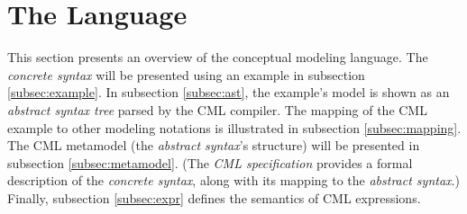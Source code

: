 \section{The Language}\label{sec:lang}
%
This section presents an overview of the conceptual modeling language.
The \emph{concrete syntax} will be presented using an example in subsection \ref{subsec:example}.
In subsection \ref{subsec:ast},
the example's model is shown as an \emph{abstract syntax tree} parsed by the CML compiler.
The mapping of the CML example to other modeling notations is illustrated in subsection \ref{subsec:mapping}.
The CML metamodel (the \emph{abstract syntax}'s structure) will be presented in subsection \ref{subsec:metamodel}.
(The \emph{CML specification} \cite{cml-repo} provides a formal description of the \emph{concrete syntax},
along with its mapping to the \emph{abstract syntax}.) Finally, subsection \ref{subsec:expr} defines the semantics of CML expressions.






